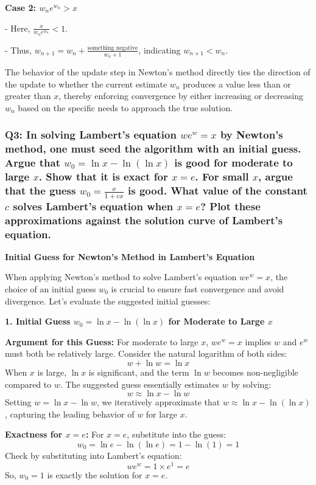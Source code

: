 \documentclass[8pt]{article}
\begin{document}
\textbf{Case 2: \(w_n e^{w_n} > x\)}

- Here, \(\frac{x}{w_n e^{w_n}} < 1\).

- Thus, \(w_{n+1} = w_n + \frac{\text{something negative}}{w_n + 1}\), indicating \(w_{n+1} < w_n\).

The behavior of the update step in Newton’s method directly ties the direction of the update to whether the current estimate \(w_n\) produces a value less than or greater than \(x\), thereby enforcing convergence by either increasing or decreasing \(w_n\) based on the specific needs to approach the true solution.

\subsubsection*{Q3: In solving Lambert’s equation \(we^w = x\) by Newton’s method, one must seed the algorithm with an initial guess. Argue that \(w_0 = \ln x - \ln(\ln x)\) is good for moderate to large \(x\). Show that it is exact for \(x = e\). For small \(x\), argue that the guess \(w_0 = \frac{x}{1 + cx}\) is good. What value of the constant \(c\) solves Lambert’s equation when \(x = e\)? Plot these approximations against the solution curve of Lambert’s equation.}

\textbf{Initial Guess for Newton's Method in Lambert's Equation}

When applying Newton's method to solve Lambert's equation \(we^w = x\), the choice of an initial guess \(w_0\) is crucial to ensure fast convergence and avoid divergence. Let's evaluate the suggested initial guesses:

\textbf{1. Initial Guess \(w_0 = \ln x - \ln(\ln x)\) for Moderate to Large \(x\)}

\textbf{Argument for this Guess:}
For moderate to large \(x\), \(we^w = x\) implies \(w\) and \(e^w\) must both be relatively large. Consider the natural logarithm of both sides:
\[ w + \ln w = \ln x \]
When \(x\) is large, \(\ln x\) is significant, and the term \(\ln w\) becomes non-negligible compared to \(w\). The suggested guess essentially estimates \(w\) by solving:
\[ w \approx \ln x - \ln w \]
Setting \(w = \ln x - \ln w\), we iteratively approximate that \(w \approx \ln x - \ln(\ln x)\), capturing the leading behavior of \(w\) for large \(x\).

\textbf{Exactness for \(x = e\):}
For \(x = e\), substitute into the guess:
\[ w_0 = \ln e - \ln(\ln e) = 1 - \ln(1) = 1 \]
Check by substituting into Lambert's equation:
\[ we^w = 1 \times e^1 = e \]
So, \(w_0 = 1\) is exactly the solution for \(x = e\).
\end{document}
